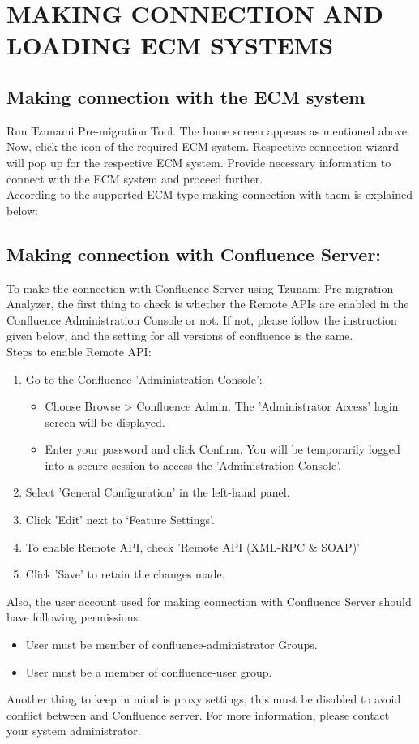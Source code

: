\section{MAKING CONNECTION AND LOADING ECM SYSTEMS}
\subsection{Making connection with the ECM system}
Run Tzunami Pre-migration Tool. The home screen appears as mentioned above. Now, click the icon of the required ECM system. Respective connection wizard will pop up for the respective ECM system. Provide necessary information to connect with the ECM system and proceed further.\\
According to the supported ECM type making connection with them is explained below:
\subsection*{Making connection with Confluence Server:}
To make the connection with Confluence Server using Tzunami Pre-migration Analyzer, the first thing to check is whether the Remote APIs are enabled in the Confluence Administration Console or not. If not, please follow the instruction given below, and the setting for all versions of confluence is the same.\\
Steps to enable Remote API:
\begin{enumerate}
	\item Go to the Confluence 'Administration Console':
	\begin{itemize}
		\item Choose Browse > Confluence Admin. The 'Administrator Access' login screen will be displayed.
		\item Enter your password and click Confirm. You will be temporarily logged into a secure session to access the 'Administration Console'.		
	\end{itemize}
	\item Select 'General Configuration' in the left-hand panel.
	\item Click 'Edit' next to ‘Feature Settings’.
	\item To enable Remote API, check 'Remote API (XML-RPC \& SOAP)'
	\item Click 'Save' to retain the changes made.
\end{enumerate}
	Also, the user account used for making connection with Confluence Server should have following permissions:
	\begin{itemize}
		\item User must be member of confluence-administrator Groups.
		\item User must be a member of confluence-user group.
	\end{itemize}
Another thing to keep in mind is proxy settings, this must be disabled to avoid conflict between \appName and Confluence server. For more information, please contact your system administrator.
